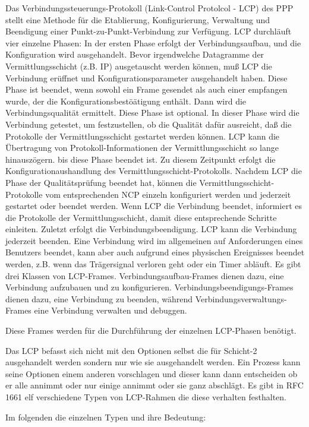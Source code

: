 \documentclass[12pt, a4paper, ngerman]{article}
\begin{document}
Das Verbindungssteuerungs-Protokoll (Link-Control Protolcol - LCP) des PPP stellt eine Methode für die Etablierung, Konfigurierung, Verwaltung und Beendigung einer Punkt-zu-Punkt-Verbindung zur Verfügung. LCP durchläuft vier einzelne Phasen:
In der ersten Phase erfolgt der Verbindungsaufbau, und die Konfiguration wird ausgehandelt. Bevor irgendwelche Datagramme der Vermittlungsschicht (z.B. IP) ausgetauscht werden können, muß LCP die Verbindung erüffnet und Konfigurationsparameter ausgehandelt haben. Diese Phase ist beendet, wenn sowohl ein Frame gesendet als auch einer empfangen wurde, der die Konfigurationsbestöätigung enthält.
Dann wird die Verbindungsqualität ermittelt. Diese Phase ist optional. In dieser Phase wird die Verbindung getestet, um festzustellen, ob die Qualität dafür ausreicht, daß die Protokolle der Vermittlungsschicht gestartet werden können. LCP kann die Übertragung von Protokoll-Informationen der Vermittlungsschicht so lange hinauszögern. bis diese Phase beendet ist.
Zu diesem Zeitpunkt erfolgt die Konfigurationaushandlung des Vermittlungsschicht-Protokolls. Nachdem LCP die Phase der Qualitätsprüfung beendet hat, können die Vermittlungsschicht-Protokolle vom entsprechenden NCP einzeln konfiguriert werden und jederzeit gestartet oder beendet werden. Wenn LCP die Verbindung beendet, informiert es die Protokolle der Vermittlungsschicht, damit diese entsprechende Schritte einleiten.
Zuletzt erfolgt die Verbindungsbeendigung. LCP kann die Verbindung jederzeit beenden. Eine Verbindung wird im allgemeinen auf Anforderungen eines Benutzers beendet, kann aber auch aufgrund eines physischen Ereignisses beendet werden, z.B. wenn das Trägersignal verloren geht oder ein Timer abläuft.
Es gibt drei Klassen von LCP-Frames. Verbindungsaufbau-Frames dienen dazu, eine Verbindung aufzubauen und zu konfigurieren. Verbindungsbeendigungs-Frames dienen dazu, eine Verbindung zu beenden, während Verbindungsverwaltungs-Frames eine Verbindung verwalten und debuggen.

Diese Frames werden für die Durchführung der einzelnen LCP-Phasen benötigt.

Das LCP befasst sich nicht mit den Optionen selbst die für Schicht-2 ausgehandelt werden sondern nur wie sie ausgehandelt werden. Ein Prozess kann seine Optionen einem anderen vorschlagen und dieser kann dann entscheiden ob er alle annimmt oder nur einige annimmt oder sie ganz abschlägt. Es gibt in RFC 1661 elf verschiedene Typen von LCP-Rahmen die diese verhalten festhalten. 

Im folgenden die einzelnen Typen und ihre Bedeutung:
\end{document}
